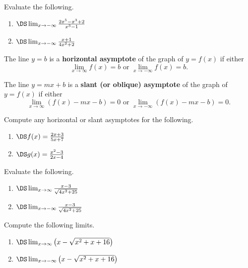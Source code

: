 \newpage


\begin{example}
Evaluate the following.
\begin{enumerate}
\item $\DS\lim_{x\to-\infty}\frac{2x^5-x^3+2}{x^3-1}$
\vfill
\item $\DS\lim_{x\to-\infty}\frac{x+1}{4x^2+2}$
\vfill
\end{enumerate}
\end{example}

\newpage

\begin{definition}
The line $y=b$ is a \textbf{horizontal asymptote} of the graph of $y=f(x)$ if either
\begin{equation*}
\lim_{x\to\infty}f(x) = b\text{ or }\lim_{x\to-\infty}f(x) = b.
\end{equation*}
\end{definition}

\begin{definition}
The line $y=mx+b$ is a \textbf{slant (or oblique) asymptote} of the graph of $y=f(x)$ if either
\begin{equation*}
\lim_{x\to\infty}\left(f(x) -mx- b\right)=0\text{ or }\lim_{x\to-\infty}\left(f(x)-mx-b\right) = 0.
\end{equation*}
\end{definition}

\begin{example}
Compute any horizontal or slant asymptotes for the following.
\begin{enumerate}
\item $\DS f(x) = \frac{2x+3}{5x+7}$
\vfill
\item $\DS g(x)=\frac{x^2-3}{2x-4}$ 
\vfill
\end{enumerate}
\end{example}

\newpage

\begin{example}
Evaluate the following.
\begin{enumerate}
\item $\DS\lim_{x\to\infty}\frac{x-3}{\sqrt{4x^2+25}}$
\vfill
\item $\DS\lim_{x\to-\infty}\frac{x-3}{\sqrt{4x^2+25}}$
\vfill
\end{enumerate}
\end{example}

\newpage

\begin{example}
Compute the following limits.
\begin{enumerate}
\item $\DS\lim_{x\to\infty}\left(x-\sqrt{x^2+x+16}\right)$
\vfill
\item $\DS\lim_{x\to-\infty}\left(x-\sqrt{x^2+x+16}\right)$
\vfill
\end{enumerate}
\end{example}

